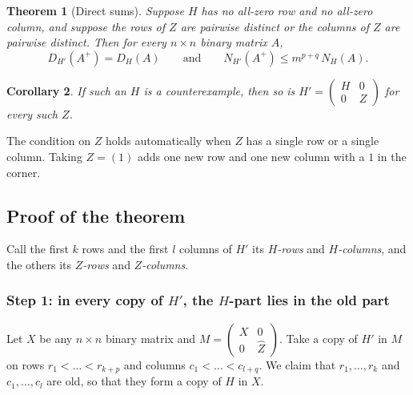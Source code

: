 \documentclass{article}
\theoremstyle{plain}
\newtheorem{theorem}{Theorem}
\newtheorem{corollary}[theorem]{Corollary}
\theoremstyle{definition}
\begin{document}
\begin{theorem}[Direct sums]\label{thm:direct}
Suppose $H$ has no all-zero row and no all-zero column, and suppose the rows of $Z$ are pairwise
distinct or the columns of $Z$ are pairwise distinct. Then for every $n \times n$ binary matrix
$A$,
\[
D_{H'}(A^+) = D_H(A)
\qquad\text{and}\qquad
N_{H'}(A^+) \le m^{p+q}\, N_H(A).
\]
\end{theorem}

\begin{corollary}\label{cor:direct}
If such an $H$ is a counterexample, then so is
$H' = \begin{pmatrix} H & 0 \\ 0 & Z \end{pmatrix}$ for every such $Z$.
\end{corollary}

The condition on $Z$ holds automatically when $Z$ has a single row or a single column. Taking
$Z = (1)$ adds one new row and one new column with a $1$ in the corner.

\subsection*{Proof of the theorem}

Call the first $k$ rows and the first $l$ columns of $H'$ its \emph{$H$-rows} and
\emph{$H$-columns}, and the others its \emph{$Z$-rows} and \emph{$Z$-columns}.

\subsubsection*{Step 1: in every copy of $H'$, the $H$-part lies in the old part}

Let $X$ be any $n \times n$ binary matrix and
$M = \begin{pmatrix} X & 0 \\ 0 & \widehat{Z} \end{pmatrix}$. Take a copy of $H'$ in $M$ on rows
$r_1 < \dots < r_{k+p}$ and columns $c_1 < \dots < c_{l+q}$. We claim that
$r_1, \dots, r_k$ and $c_1, \dots, c_l$ are old, so that they form a copy of $H$ in $X$.
\end{document}
